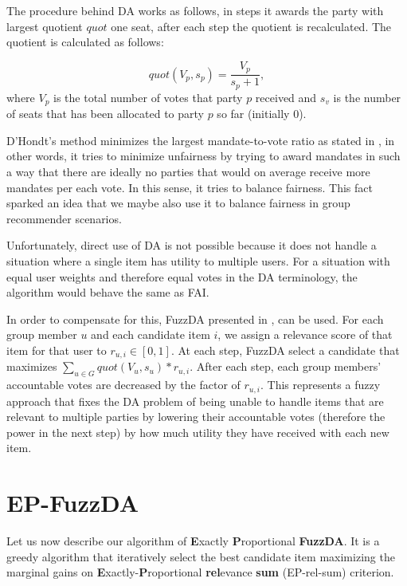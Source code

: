 The procedure behind DA works as follows, in steps it awards the party with largest quotient $quot$ one seat, after each step the quotient is recalculated. The quotient is calculated as follows:

\begin{equation}
    quot(V_p, s_p) = \dfrac{V_p}{s_p + 1},
\end{equation}
where $V_p$ is the total number of votes that party $p$ received and $s_v$ is the number of seats that has been allocated to party $p$ so far (initially 0).

D'Hondt's method minimizes the largest mandate-to-vote ratio as stated in \cite{wiki:dhondt_method}, in other words, it tries to minimize unfairness by trying to award mandates in such a way that there are ideally no parties that would on average receive more mandates per each vote. In this sense, it tries to balance fairness.
This fact sparked an idea that we maybe also use it to balance fairness in group recommender scenarios.

Unfortunately, direct use of DA is not possible because it does not handle a situation where a single item has utility to multiple users. For a situation with equal user weights and therefore equal votes in the DA terminology, the algorithm would behave the same as FAI.

In order to compensate for this, FuzzDA presented in \cite{fuzz_da}, can be used. For each group member $u$ and each candidate item $i$, we assign a relevance score of that item for that user to $r_{u,i} \in [0,1]$. At each step, FuzzDA select a candidate that maximizes $\sum_{u \in G} quot(V_u, s_u) * r_{u,i}$. After each step, each group members' accountable votes are decreased by the factor of $r_{u,i}$. This represents a fuzzy approach that fixes the DA problem of being unable to handle items that are relevant to multiple parties by lowering their accountable votes (therefore the power in the next step) by how much utility they have received with each new item.

\section{EP-FuzzDA}

Let us now describe our algorithm of \textbf{E}xactly \textbf{P}roportional \textbf{FuzzDA}. It is a greedy algorithm that iteratively select the best candidate item maximizing the marginal gains on \textbf{E}xactly-\textbf{P}roportional \textbf{rel}evance \textbf{sum} (EP-rel-sum) criterion.

